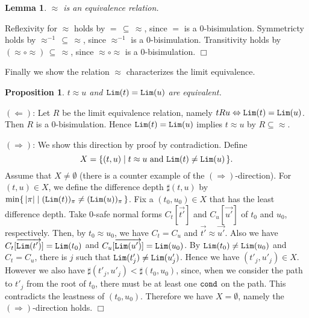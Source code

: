 \documentclass{article}
\newcommand\Lim[1]{{\tt Lim}(#1)}
\newtheorem{lemma}[theorem]{Lemma}
\newtheorem{proposition}[theorem]{Proposition}
\newenvironment{proof}[1][Proof]{\begin{trivlist}
\item[\hskip \labelsep {\bfseries #1}]}{\end{trivlist}}
\begin{document}
\begin{lemma}
  $\approx$ is an equivalence relation.
\end{lemma}
\begin{proof}
  Reflexivity for $\approx$ holds by $=\,\subseteq\,\approx$, since $=$ is a $0$-bisimulation.
  Symmetricty holds by $\approx^{-1}\,\subseteq\,\approx$, since $\approx^{-1}$ is a $0$-bisimulation.
  Transitivity holds by $(\approx\circ\approx)\,\subseteq\,\approx$, since $\approx\circ\approx$ is a $0$-bisimulation.
  \hfill$\Box$
\end{proof}

Finally we show the relation $\approx$ characterizes the limit equivalence. 
\begin{proposition}
  $t \approx u$ and $\Lim{t} = \Lim{u}$ are equivalent. 
\end{proposition}
\begin{proof}
  $(\Leftarrow)$: Let $R$ be the limit equivalence relation, namely $tRu \Leftrightarrow \Lim{t}=\Lim{u}$. 
  Then $R$ is a $0$-bisimulation.
  Hence $\Lim{t} = \Lim{u}$ implies $t \approx u$ by $R \subseteq \approx$. 
  
  $(\Rightarrow)$:
  We show this direction by proof by contradiction.
  Define
  \[
  X = \{(t,u) \mid \text{$t \approx u$ and $\Lim{t} \neq \Lim{u}$}\,\}.
  \]
  Assume that $X \neq \emptyset$ (there is a counter example of the $(\Rightarrow)$-direction). 
  For $(t,u)\in X$, we define the difference depth $\sharp(t,u)$
  by $\min\{\,|\pi| \mid (\Lim{t})_{\pi} \neq (\Lim{u})_{\pi}\,\}$. 
  Fix a $(t_0,u_0) \in X$ that has the least difference depth.
  Take $0$-safe normal forms $C_t[\vec{t'}]$ and $C_u[\vec{u'}]$ of $t_0$ and $u_0$, respectively. 
  Then, by $t_0\approx u_0$, we have $C_t = C_u$ and $\vec{t'} \approx \vec{u'}$. 
  Also we have $C_t[\overrightarrow{\Lim{t'}}] = \Lim{t_0}$ and $C_u[\overrightarrow{\Lim{u'}}] = \Lim{u_0}$. 
  By $\Lim{t_0}\neq \Lim{u_0}$ and $C_t=C_u$,
  there is $j$ such that $\Lim{t'_j} \neq \Lim{u'_j}$. 
  Hence we have $(t'_j,u'_j) \in X$. 
  However we also have $\sharp(t'_j,u'_j) < \sharp(t_0,u_0)$,
  since, when we consider the path to $t'_j$ from the root of $t_0$,
  there must be at least one ${\tt cond}$ on the path.
  This contradicts the leastness of $(t_0,u_0)$.
  Therefore we have $X = \emptyset$, namely the $(\Rightarrow)$-direction holds.
  \hfill$\Box$
\end{proof}
  
\end{document}
